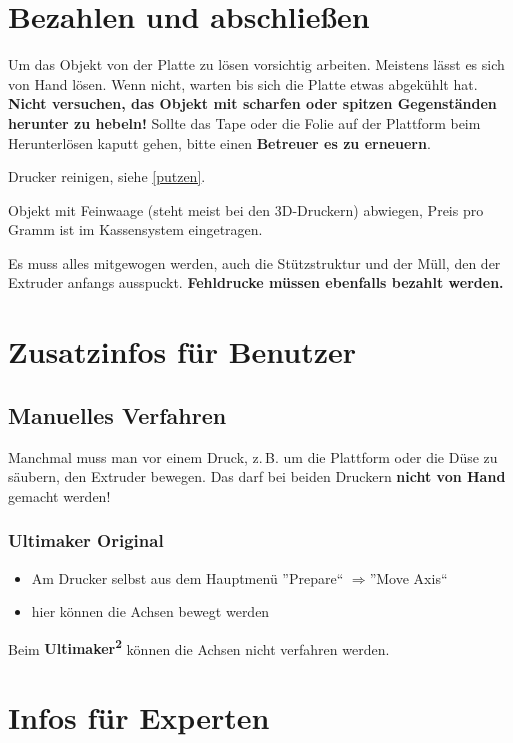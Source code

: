 \documentclass{\basedir/fablab-document}
\newcommand{\ts}[1]{\textsuperscript{#1}}
\newcommand{\ra}{$\Rightarrow$}
\begin{document}
	\section{Bezahlen und abschließen}
	
	Um das Objekt von der Platte zu lösen vorsichtig arbeiten. Meistens lässt es sich von Hand lösen. Wenn nicht,
	warten bis sich die Platte etwas abgekühlt hat. \textbf{Nicht versuchen, das Objekt mit scharfen oder spitzen Gegenständen herunter zu hebeln!}
	Sollte das Tape oder die Folie auf der Plattform beim Herunterlösen kaputt gehen, bitte einen \textbf{Betreuer es zu erneuern}.
	
	Drucker reinigen, siehe \ref{putzen}.
	
	Objekt mit Feinwaage (steht meist bei den 3D-Druckern) abwiegen, Preis pro Gramm ist im Kassensystem eingetragen.
	
	Es muss alles mitgewogen werden, auch die Stützstruktur und der Müll, den der Extruder anfangs ausspuckt. \textbf{Fehldrucke müssen ebenfalls bezahlt werden.}
	\pagebreak
	
	
	\section{Zusatzinfos für Benutzer}
	
	\subsection{Manuelles Verfahren}\label{manuelles-verfahren}
	Manchmal muss man vor einem Druck, z.\,B. um die Plattform oder die Düse zu säubern, den Extruder bewegen.
	Das darf bei beiden Druckern \textbf{nicht von Hand} gemacht werden!
	
	\subsubsection{Ultimaker Original}
	\begin{itemize}
		\item Am Drucker selbst aus dem Hauptmenü ''Prepare`` \ra ''Move Axis``
		\item hier können die Achsen bewegt werden
	\end{itemize}
	Beim \textbf{Ultimaker\ts2} können die Achsen nicht verfahren werden.

	
	
	\section{Infos für Experten}
	
\end{document}
